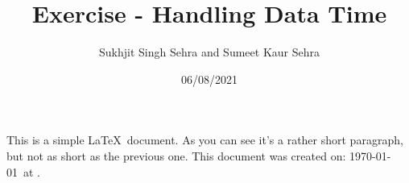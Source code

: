 \documentclass[12pt]{article}
\author{Sukhjit Singh Sehra and Sumeet Kaur Sehra}
\title{Exercise - Handling Data Time}
\date{06/08/2021}
\begin{document}
\maketitle

This is a simple \LaTeX\ document.
As you can see it's a rather short paragraph, but not 
as short as the previous one. This document was 
created on: \today\ at \currenttime.
\end{document}
